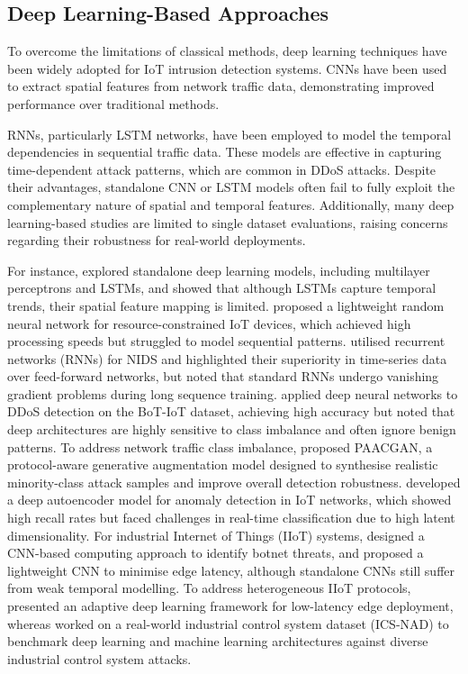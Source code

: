 \documentclass[a4paper,fleqn]{cas-sc}
\begin{document}
\subsection{Deep Learning-Based Approaches}

To overcome the limitations of classical methods, deep learning techniques have been widely adopted for IoT intrusion detection systems. CNNs have been used to extract spatial features from network traffic data, demonstrating improved performance over traditional methods.

RNNs, particularly LSTM networks, have been employed to model the temporal dependencies in sequential traffic data. These models are effective in capturing time-dependent attack patterns, which are common in DDoS attacks. Despite their advantages, standalone CNN or LSTM models often fail to fully exploit the complementary nature of spatial and temporal features. Additionally, many deep learning-based studies are limited to single dataset evaluations, raising concerns regarding their robustness for real-world deployments.

For instance, \cite{roopak2019deep} explored standalone deep learning models, including multilayer perceptrons and LSTMs, and showed that although LSTMs capture temporal trends, their spatial feature mapping is limited. \cite{latif2020lightweight} proposed a lightweight random neural network for resource-constrained IoT devices, which achieved high processing speeds but struggled to model sequential patterns. \cite{yin2020deep} utilised recurrent networks (RNNs) for NIDS and highlighted their superiority in time-series data over feed-forward networks, but noted that standard RNNs undergo vanishing gradient problems during long sequence training. \cite{basnet2022deep} applied deep neural networks to DDoS detection on the BoT-IoT dataset, achieving high accuracy but noted that deep architectures are highly sensitive to class imbalance and often ignore benign patterns. To address network traffic class imbalance, \cite{islam2026paacgan} proposed PAACGAN, a protocol-aware generative augmentation model designed to synthesise realistic minority-class attack samples and improve overall detection robustness. \cite{abbasi2021deep} developed a deep autoencoder model for anomaly detection in IoT networks, which showed high recall rates but faced challenges in real-time classification due to high latent dimensionality. For industrial Internet of Things (IIoT) systems, \cite{nguyen2022cnn} designed a CNN-based computing approach to identify botnet threats, and \cite{BENADDI2025101624} proposed a lightweight CNN to minimise edge latency, although standalone CNNs still suffer from weak temporal modelling. To address heterogeneous IIoT protocols, \cite{Jyothi2024edgeids} presented an adaptive deep learning framework for low-latency edge deployment, whereas \cite{zhou2026icsnad} worked on a real-world industrial control system dataset (ICS-NAD) to benchmark deep learning and machine learning architectures against diverse industrial control system attacks.
\end{document}
